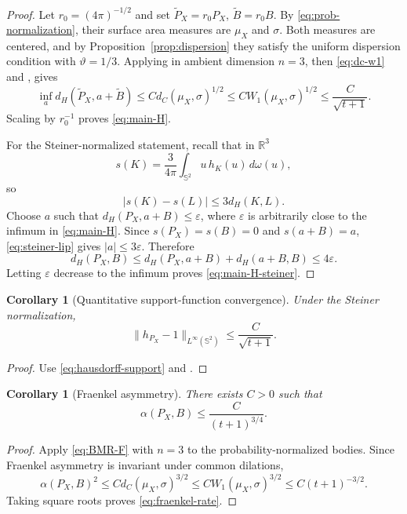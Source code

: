 \documentclass[11pt]{article}
\newtheorem{corollary}[theorem]{Corollary}
\theoremstyle{definition}
\theoremstyle{remark}
\newcommand{\Sph}{\mathbb S}
\newcommand{\R}{\mathbb R}
\newcommand{\eps}{\varepsilon}
\begin{document}
\begin{proof}
Let $r_0=(4\pi)^{-1/2}$ and set $\widetilde P_X=r_0P_X$, $\widetilde B=r_0B$. By \eqref{eq:prob-normalization}, their surface area measures are $\mu_X$ and $\sigma$. Both measures are centered, and by Proposition~\ref{prop:dispersion} they satisfy the uniform dispersion condition with $\vartheta=1/3$. Applying  in ambient dimension $n=3$, then \eqref{eq:dc-w1} and , gives
\[
\inf_a d_H(\widetilde P_X,a+\widetilde B)
\le C d_C(\mu_X,\sigma)^{1/2}
\le C W_1(\mu_X,\sigma)^{1/2}
\le \frac{C}{\sqrt{t+1}}.
\]
Scaling by $r_0^{-1}$ proves \eqref{eq:main-H}.

For the Steiner-normalized statement, recall that in $\R^3$
\[
s(K)=\frac{3}{4\pi}\int_{\Sph^2}u\,h_K(u)\,d\omega(u),
\]
so
\begin{equation}\label{eq:steiner-lip}
|s(K)-s(L)|\le3d_H(K,L).
\end{equation}
Choose $a$ such that $d_H(P_X,a+B)\le\eps$, where $\eps$ is arbitrarily close to the infimum in \eqref{eq:main-H}. Since $s(P_X)=s(B)=0$ and $s(a+B)=a$, \eqref{eq:steiner-lip} gives $|a|\le3\eps$. Therefore
\[
d_H(P_X,B)
\le d_H(P_X,a+B)+d_H(a+B,B)
\le4\eps.
\]
Letting $\eps$ decrease to the infimum proves \eqref{eq:main-H-steiner}.
\end{proof}

\begin{corollary}[Quantitative support-function convergence]\label{cor:support-convergence}
Under the Steiner normalization,
\[
\|h_{P_X}-1\|_{L^\infty(\Sph^2)}\le\frac{C}{\sqrt{t+1}}.
\]
\end{corollary}

\begin{proof}
Use \eqref{eq:hausdorff-support} and .
\end{proof}

\begin{corollary}[Fraenkel asymmetry]\label{cor:fraenkel}
There exists $C>0$ such that
\begin{equation}\label{eq:fraenkel-rate}
\alpha(P_X,B)\le\frac{C}{(t+1)^{3/4}}.
\end{equation}
\end{corollary}

\begin{proof}
Apply \eqref{eq:BMR-F} with $n=3$ to the probability-normalized bodies. Since Fraenkel asymmetry is invariant under common dilations,
\[
\alpha(P_X,B)^2
\le C d_C(\mu_X,\sigma)^{3/2}
\le C W_1(\mu_X,\sigma)^{3/2}
\le C(t+1)^{-3/2}.
\]
Taking square roots proves \eqref{eq:fraenkel-rate}.
\end{proof}
\end{document}
